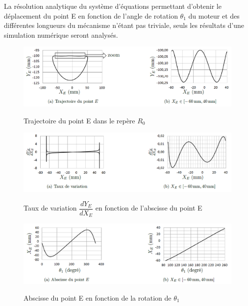
La résolution analytique du système d'équations permettant d'obtenir le déplacement du point E en fonction de l'angle de rotation $\theta_1$ du moteur et des différentes longueurs du mécanisme n'étant pas triviale, seuls les résultats d'une simulation numérique seront analysés.

\begin{figure}[ht!]
\begin{center}
 \includegraphics[width=0.9\linewidth]{img/Figure6}
  \caption{Trajectoire du point E dans le repère $R_0$}
 \label{fig6} 
 \includegraphics[width=0.9\linewidth]{img/Figure7}
  \caption{Taux de variation $\dfrac{dY_E}{dX_E}$ en fonction de l'abscisse du point E}
 \label{fig7} 
 \includegraphics[width=0.9\linewidth]{img/Figure8}
  \caption{Abscisse du point E en fonction de la rotation de $\theta_1$}
 \label{fig8} 
 \end{center}
\end{figure}


